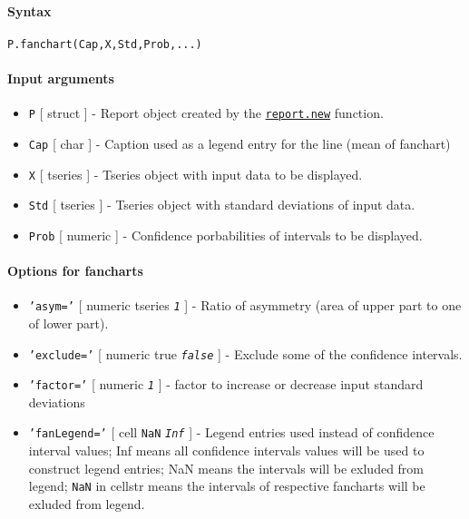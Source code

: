 


	\paragraph{Syntax}\label{syntax}

\begin{verbatim}
P.fanchart(Cap,X,Std,Prob,...)
\end{verbatim}

\paragraph{Input arguments}\label{input-arguments}

\begin{itemize}
\item
  \texttt{P} {[} struct {]} - Report object created by the
  \href{report/new}{\texttt{report.new}} function.
\item
  \texttt{Cap} {[} char {]} - Caption used as a legend entry for the
  line (mean of fanchart)
\item
  \texttt{X} {[} tseries {]} - Tseries object with input data to be
  displayed.
\item
  \texttt{Std} {[} tseries {]} - Tseries object with standard deviations
  of input data.
\item
  \texttt{Prob} {[} numeric {]} - Confidence porbabilities of intervals
  to be displayed.
\end{itemize}

\paragraph{Options for fancharts}\label{options-for-fancharts}

\begin{itemize}
\item
  \texttt{'asym='} {[} numeric \textbar{} tseries \textbar{}
  \emph{\texttt{1}} {]} - Ratio of asymmetry (area of upper part to one
  of lower part).
\item
  \texttt{'exclude='} {[} numeric \textbar{} true \textbar{}
  \emph{\texttt{false}} {]} - Exclude some of the confidence intervals.
\item
  \texttt{'factor='} {[} numeric \textbar{} \emph{\texttt{1}} {]} -
  factor to increase or decrease input standard deviations
\item
  \texttt{'fanLegend='} {[} cell \textbar{} \texttt{NaN} \textbar{}
  \emph{\texttt{Inf}} {]} - Legend entries used instead of confidence
  interval values; Inf means all confidence intervals values will be
  used to construct legend entries; NaN means the intervals will be
  exluded from legend; \texttt{NaN} in cellstr means the intervals of
  respective fancharts will be exluded from legend.
\end{itemize}

